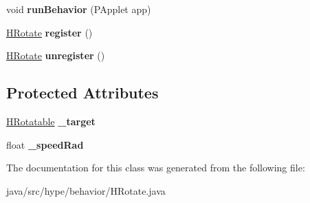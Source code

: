 \begin{DoxyCompactItemize}
\item 
\hypertarget{classhype_1_1behavior_1_1_h_rotate_ac4a2819434de5dd46a504daa1091690a}{void {\bfseries run\-Behavior} (P\-Applet app)}\label{classhype_1_1behavior_1_1_h_rotate_ac4a2819434de5dd46a504daa1091690a}

\item 
\hypertarget{classhype_1_1behavior_1_1_h_rotate_a6eb051237ab08371594724ecce89d813}{\hyperlink{classhype_1_1behavior_1_1_h_rotate}{H\-Rotate} {\bfseries register} ()}\label{classhype_1_1behavior_1_1_h_rotate_a6eb051237ab08371594724ecce89d813}

\item 
\hypertarget{classhype_1_1behavior_1_1_h_rotate_a0ff42539a4246ef9bc2235fc391d43b7}{\hyperlink{classhype_1_1behavior_1_1_h_rotate}{H\-Rotate} {\bfseries unregister} ()}\label{classhype_1_1behavior_1_1_h_rotate_a0ff42539a4246ef9bc2235fc391d43b7}

\end{DoxyCompactItemize}
\subsection*{Protected Attributes}
\begin{DoxyCompactItemize}
\item 
\hypertarget{classhype_1_1behavior_1_1_h_rotate_a820318c2953c93624ab29ebe3f3e6182}{\hyperlink{interfacehype_1_1interfaces_1_1_h_rotatable}{H\-Rotatable} {\bfseries \-\_\-target}}\label{classhype_1_1behavior_1_1_h_rotate_a820318c2953c93624ab29ebe3f3e6182}

\item 
\hypertarget{classhype_1_1behavior_1_1_h_rotate_a5061f65cfd851f59f492ae6324eb7df6}{float {\bfseries \-\_\-speed\-Rad}}\label{classhype_1_1behavior_1_1_h_rotate_a5061f65cfd851f59f492ae6324eb7df6}

\end{DoxyCompactItemize}


The documentation for this class was generated from the following file\-:\begin{DoxyCompactItemize}
\item 
java/src/hype/behavior/H\-Rotate.\-java\end{DoxyCompactItemize}
